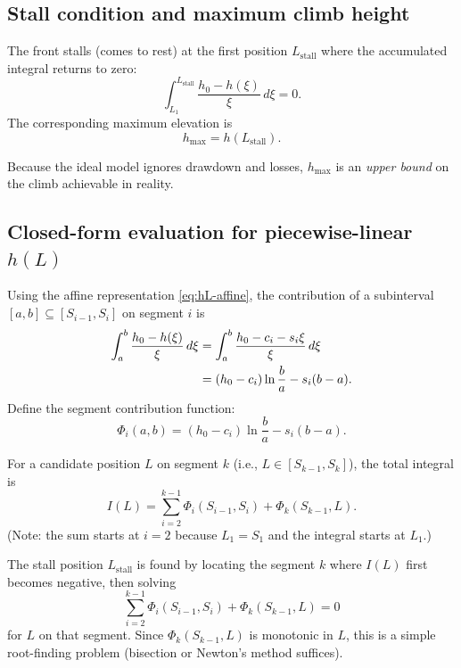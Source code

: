 \documentclass[11pt]{article}
\theoremstyle{definition}
\begin{document}
\subsection{Stall condition and maximum climb height}

The front stalls (comes to rest) at the first position $L_{\text{stall}}$ where the 
accumulated integral returns to zero:
\begin{equation}
  \boxed{\int_{L_1}^{L_{\text{stall}}} \frac{h_0 - h(\xi)}{\xi}\,d\xi = 0.}
  \label{eq:stall-condition}
\end{equation}
The corresponding maximum elevation is
\begin{equation}
  h_{\max} = h(L_{\text{stall}}).
  \label{eq:hmax}
\end{equation}

Because the ideal model ignores drawdown and losses, $h_{\max}$ is an \emph{upper bound} 
on the climb achievable in reality.

\subsection{Closed-form evaluation for piecewise-linear $h(L)$}

Using the affine representation \eqref{eq:hL-affine}, the contribution of a subinterval 
$[a, b] \subseteq [S_{i-1}, S_i]$ on segment $i$ is
\begin{align}
  \int_a^b \frac{h_0 - h(\xi)}{\xi}\,d\xi 
  &= \int_a^b \frac{h_0 - c_i - s_i \xi}{\xi}\,d\xi \notag \\
  &= (h_0 - c_i) \ln\frac{b}{a} - s_i (b - a).
  \label{eq:segment-integral}
\end{align}
Define the segment contribution function:
\begin{equation}
  \Phi_i(a, b) = (h_0 - c_i) \ln\frac{b}{a} - s_i(b - a).
  \label{eq:Phi}
\end{equation}

For a candidate position $L$ on segment $k$ (i.e., $L \in [S_{k-1}, S_k]$), the total 
integral is
\begin{equation}
  I(L) = \sum_{i=2}^{k-1} \Phi_i(S_{i-1}, S_i) + \Phi_k(S_{k-1}, L).
  \label{eq:total-integral}
\end{equation}
(Note: the sum starts at $i = 2$ because $L_1 = S_1$ and the integral starts at $L_1$.)

The stall position $L_{\text{stall}}$ is found by locating the segment $k$ where $I(L)$ 
first becomes negative, then solving
\begin{equation}
  \sum_{i=2}^{k-1} \Phi_i(S_{i-1}, S_i) + \Phi_k(S_{k-1}, L) = 0
  \label{eq:stall-piecewise}
\end{equation}
for $L$ on that segment. Since $\Phi_k(S_{k-1}, L)$ is monotonic in $L$, this is a simple 
root-finding problem (bisection or Newton's method suffices).
\end{document}
